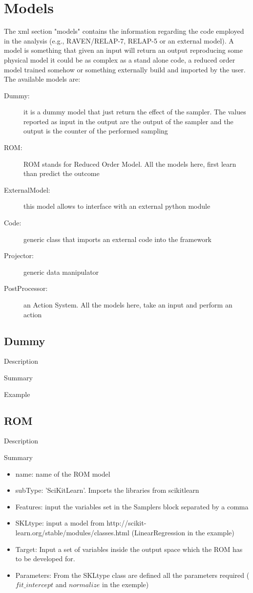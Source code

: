 \section{Models  \\ \vspace{2 mm} {\small }}

The xml section "models" contains the information regarding the code employed in the analysis (e.g., RAVEN/RELAP-7, RELAP-5 or an external model). A model is something that given an input will return an output reproducing some physical model it could be as complex as a stand alone code, a reduced order model trained somehow or something externally build and imported by the user.
The available models are:
\begin{description}
\item [Dummy:] it is a dummy model that just return the effect of the sampler. The values reported as input in the output are the output of the sampler and the output is the counter of the performed sampling
\item [ROM:] ROM stands for Reduced Order Model. All the models here, first learn than predict the outcome
\item [ExternalModel:] this model allows to interface with an external python module
\item [Code:] generic class that imports an external code into the framework
\item [Projector:] generic data manipulator
\item [PostProcessor:] an Action System. All the models here, take an input and perform an action
\end{description}

\subsection{Dummy}
\label{sec:models_dummy}

Description

Summary

Example

\subsection{ROM}
\label{sec:models_ROM}

Description

Summary 
\begin{itemize}
\item name: name of the ROM model
\item subType: 'SciKitLearn'. Imports the libraries from scikitlearn
\item Features: input the variables set in the Samplers block separated by a comma
\item SKLtype: input a model from http://scikit-learn.org/stable/modules/classes.html (LinearRegression in the example)
\item Target: Input a set of variables inside the output space which the ROM has to be developed for. 
\item Parameters: From the SKLtype class are defined all the parameters required ($fit\_intercept$ and $normalize$ in the exemple) 
\end{itemize}

